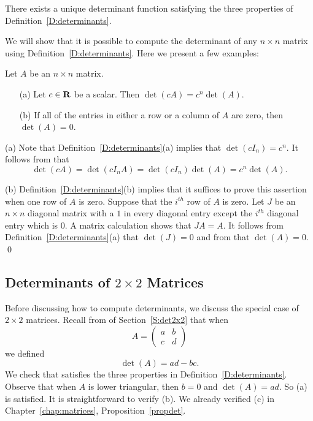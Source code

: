 \begin{thm}  \label{T:determinants}
There exists a unique determinant function satisfying the three
properties of Definition~\ref{D:determinants}.
\end{thm}

We will show that it is possible to compute the determinant of
any $n\times n$ matrix using Definition~\ref{D:determinants}.
Here we present a few examples:

\begin{lemma}
Let $A$ be an $n\times n$ matrix.
\begin{itemize}
\item[(a)]   Let $c\in\mbox{$\bf{R}$}$ be a scalar.  Then $\det(cA) = c^n\det(A)$.
\item[(b)] If all of the entries in either a row or a column of $A$ are 
zero, then $\det(A)=0$.
\end{itemize}
\end{lemma}

\proof  (a) Note that Definition~\ref{D:determinants}(a) implies that 
$\det(cI_n)=c^n$.  It follows from  that
\[
\det(cA) = \det(cI_n A) = \det(cI_n)\det(A) = c^n\det(A).
\]

(b)  Definition~\ref{D:determinants}(b) implies that it suffices to prove 
this assertion when one row of $A$ is zero.  Suppose that the $i^{th}$ row 
of $A$ is zero.  Let $J$ be an $n\times n$ 
diagonal matrix with a $1$ in every diagonal entry except the $i^{th}$ 
diagonal entry which is $0$.  A matrix calculation shows that $JA=A$. 
It follows from Definition~\ref{D:determinants}(a) that $\det(J)=0$ and 
from  that $\det(A)=0$.  \qed 



\subsection*{Determinants of $2\times 2$ Matrices}
 
Before discussing how to compute determinants, we discuss the
special case of $2\times 2$ matrices.  Recall from  of 
Section~\ref{S:det2x2} that when 
\[
A=\left(\begin{array}{cc} a & b\\c & d \end{array}\right)
\]
we defined 
\begin{equation}  \label{e:determinantn=2}
\det(A)=ad-bc.
\end{equation}
We check that  satisfies the three
properties in Definition~\ref{D:determinants}.  Observe that when
$A$ is lower triangular, then $b=0$ and $\det(A)=ad$.  So (a) is
satisfied.  It is straightforward to verify (b).  We already
verified (c) in Chapter~\ref{chap:matrices}, Proposition~\ref{propdet}.


